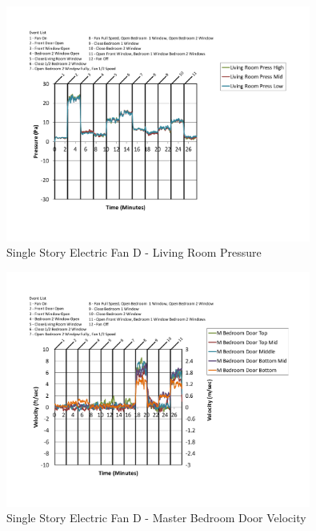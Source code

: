 \documentclass{article}
\begin{document}
\begin{appendices}
	\begin{figure}[H]
		\centering
		\includegraphics[height=3.05in,trim=0.67in 1.1in 0.67in 0.8in,clip=true]{0_Images/Results_Charts/ColdFlow/Single_Story/Electric/D/Living_Room_Pressure.pdf}
		\caption{Single Story Electric Fan D - Living Room Pressure}
	\end{figure}
 

	\begin{figure}[H]
		\centering
		\includegraphics[height=3.05in,trim=0.67in 1.1in 0.67in 0.8in,clip=true]{0_Images/Results_Charts/ColdFlow/Single_Story/Electric/D/Master_Bedroom_Door_Velocity.pdf}
		\caption{Single Story Electric Fan D - Master Bedroom Door Velocity}
	\end{figure}
 
	\clearpage


\end{appendices}
\end{document}
